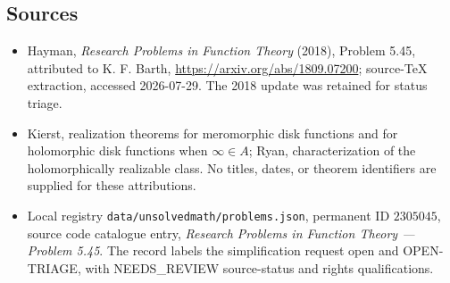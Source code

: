 \documentclass[11pt]{article}
\begin{document}
\subsection{Sources}
\begin{itemize}
\item Hayman, \emph{Research Problems in Function Theory} (2018), Problem 5.45, attributed to K. F. Barth, \url{https://arxiv.org/abs/1809.07200}; source-TeX extraction, accessed 2026-07-29. The 2018 update was retained for status triage.
\item Kierst, realization theorems for meromorphic disk functions and for holomorphic disk functions when $\infty\in A$; Ryan, characterization of the holomorphically realizable class. No titles, dates, or theorem identifiers are supplied for these attributions.
\item Local registry \texttt{data/unsolvedmath/problems.json}, permanent ID $2305045$, source code catalogue entry, \emph{Research Problems in Function Theory --- Problem 5.45}. The record labels the simplification request open and OPEN-TRIAGE, with NEEDS\_REVIEW source-status and rights qualifications.
\end{itemize}
\end{document}
